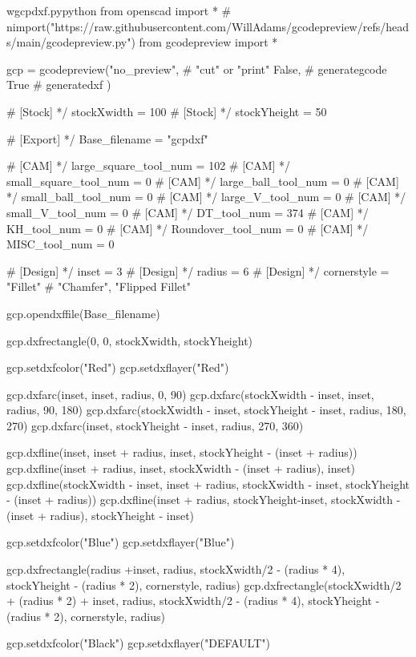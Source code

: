 \documentclass{ltxdoc}
\begin{document}
\lstset{firstnumber=1}%
\begin{writecode}{w}{gcpdxf.py}{python}
from openscad import *
    # nimport("https://raw.githubusercontent.com/WillAdams/gcodepreview/refs/heads/main/gcodepreview.py")
from gcodepreview import *

gcp = gcodepreview("no_preview", # "cut" or "print"
                   False, # generategcode
                   True   # generatedxf
                   )

# [Stock] */
stockXwidth = 100
# [Stock] */
stockYheight = 50

# [Export] */
Base_filename = "gcpdxf"


# [CAM] */
large_square_tool_num = 102
# [CAM] */
small_square_tool_num = 0
# [CAM] */
large_ball_tool_num = 0
# [CAM] */
small_ball_tool_num = 0
# [CAM] */
large_V_tool_num = 0
# [CAM] */
small_V_tool_num = 0
# [CAM] */
DT_tool_num = 374
# [CAM] */
KH_tool_num = 0
# [CAM] */
Roundover_tool_num = 0
# [CAM] */
MISC_tool_num = 0

# [Design] */
inset = 3
# [Design] */
radius = 6
# [Design] */
cornerstyle = "Fillet"  # "Chamfer", "Flipped Fillet"

gcp.opendxffile(Base_filename)

gcp.dxfrectangle(0, 0, stockXwidth, stockYheight)

gcp.setdxfcolor("Red")
gcp.setdxflayer("Red")

gcp.dxfarc(inset, inset, radius,  0, 90)
gcp.dxfarc(stockXwidth - inset, inset, radius, 90, 180)
gcp.dxfarc(stockXwidth - inset, stockYheight - inset, radius, 180, 270)
gcp.dxfarc(inset, stockYheight - inset, radius, 270, 360)

gcp.dxfline(inset, inset + radius, inset, stockYheight - (inset + radius))
gcp.dxfline(inset + radius, inset, stockXwidth - (inset + radius), inset)
gcp.dxfline(stockXwidth - inset, inset + radius, stockXwidth - inset, stockYheight - (inset + radius))
gcp.dxfline(inset + radius, stockYheight-inset, stockXwidth - (inset + radius), stockYheight - inset)

gcp.setdxfcolor("Blue")
gcp.setdxflayer("Blue")

gcp.dxfrectangle(radius +inset, radius, stockXwidth/2 - (radius * 4), stockYheight - (radius * 2), cornerstyle, radius)
gcp.dxfrectangle(stockXwidth/2 + (radius * 2) + inset, radius, stockXwidth/2 - (radius * 4), stockYheight - (radius * 2), cornerstyle, radius)

gcp.setdxfcolor("Black")
gcp.setdxflayer("DEFAULT")


\end{writecode}
\end{document}

